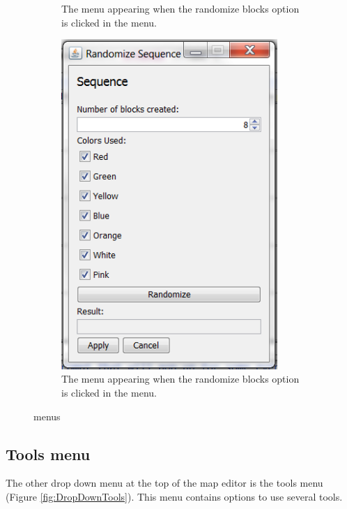 \begin{figure}[h!!!]
\begin{subfigure}[b]{0.32\textwidth}
	\caption{The menu appearing when the randomize blocks option is clicked in the menu.}
	\label{fig:MenuBlocks}
        \end{subfigure}
        \begin{subfigure}[b]{0.32\textwidth}
	\center
	\includegraphics[width=0.9\textwidth]{EnvironmentStore/MenuSeq.png}
	\caption{The menu appearing when the randomize blocks option is clicked in the menu.}
	\label{fig:MenuSeq}
        \end{subfigure}

        \caption{menus}\label{fig:whatever}
\end{figure}

\subsection{Tools menu}
The other drop down menu at the top of the map editor is the tools menu (Figure \ref{fig:DropDownTools}). This menu contains options to use several tools.


